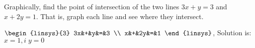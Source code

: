 

\begin{Exercise}[
name={},
title={}, 
difficulty=0,
origin={\cite{KK}}]
Graphically, find the point of intersection of the two lines 
$3x+y=3$ and $x+2y=1.$ That is, graph each line
and see where they intersect. 
\end{Exercise}

\begin{Answer}
$\begin{linsys}{3}
3x&+&y&=&3 \\
x&+&2y&=&1
\end{linsys}
$, Solution is: $x=1,i\;y=0$
\end{Answer}
